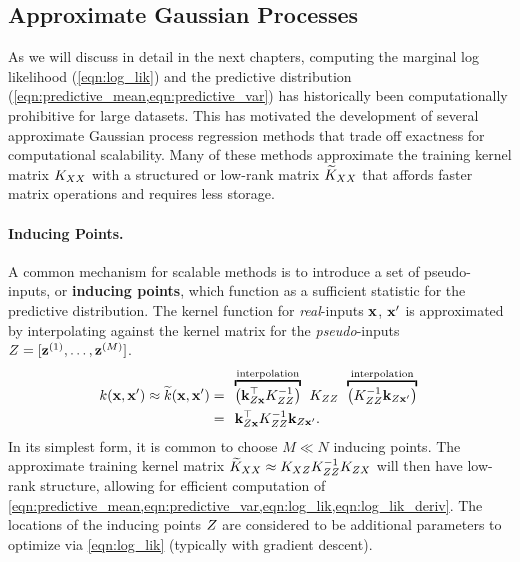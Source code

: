 \subsection{Approximate Gaussian Processes}
\label{sec:approx_gps}

As we will discuss in detail in the next chapters, computing the marginal log likelihood (\cref{eqn:log_lik}) and the predictive distribution (\cref{eqn:predictive_mean,eqn:predictive_var}) has historically been computationally prohibitive for large datasets.
This has motivated the development of several approximate Gaussian process regression methods \citep[e.g.][]{quinonero2005unifying,snelson2006sparse,rahimi2008random,titsias2009variational,hensman2013gaussian,wilson2015kernel,gardner2018product,evans2018scalable} that trade off exactness for computational scalability.
Many of these methods approximate the training kernel matrix $K_{XX}$ with a structured or low-rank matrix $\widetilde{K}_{XX}$ that affords faster matrix operations and requires less storage.

\paragraph{Inducing Points.}
A common mechanism for scalable methods is to introduce a set of pseudo-inputs, or {\bf inducing points}, which function as a sufficient statistic for the predictive distribution.
The kernel function for \emph{real}-inputs $\mathbf{x}$, $\mathbf{x}'$ is approximated by interpolating against the kernel matrix for the \emph{pseudo}-inputs $Z = [\mathbf{z}^{(1)}, \ldots, \mathbf{z}^{(M)}]$.
%
\begin{align}
  k(\bx, \bx') \approx \widetilde k(\bx, \bx') &= \:\:
		\overbracket{ \left( \bk_{\bZ\bx}^\top \bK_{\bZ\bZ}^{-1} \right) }^{\text{interpolation}} \:\: \bK_{\bZ\bZ} \:\:
		\overbracket{ \left( \bK_{\bZ\bZ}^{-1} \bk_{\bZ\bx'} 		 \right) }^{\text{interpolation}}
	\nonumber{} \\
	&= \:\:
	\bk_{\bZ\bx}^\top \bK_{\bZ\bZ}^{-1} \bk_{\bZ\bx'}.
	\label{eqn:inducing_interpolation}
\end{align}
%
In its simplest form, it is common to choose $M \ll N$ inducing points.
The approximate training kernel matrix $\widetilde {K}_{XX} \approx K_{XZ} K_{ZZ}^{-1} K_{ZX}$ will then have low-rank structure, allowing for efficient computation of \cref{eqn:predictive_mean,eqn:predictive_var,eqn:log_lik,eqn:log_lik_deriv}.
The locations of the inducing points $Z$ are considered to be additional parameters to optimize via \cref{eqn:log_lik} (typically with gradient descent).

